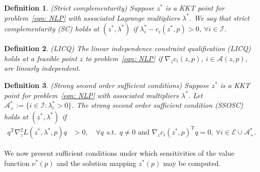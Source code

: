 \documentclass{article}
\newcommand{\tr}[1]{\ensuremath{{#1}^\text{T}}}
\newcommand{\A}{\mathcal{A}}
\newcommand{\E}{\mathcal{E}}
\newcommand{\I}{\mathcal{I}}
\newcommand{\1}[1]{\mathds{1}\left[#1\right]}
\newtheorem{definition}{Definition}
\begin{document}
\begin{definition}{(Strict  complementarity)}
Suppose $z^*$ is a KKT point for problem~\eqref{eqn: NLP} with associated Lagrange multipliers $\lambda^*$. 
We say that strict complementarity (SC) holds at $(z^*, \lambda^*)$ if $\lambda^*_i - c_i(z^*,p) > 0$, $\forall i \in \I$.
\end{definition}




\begin{definition}{(LICQ)}
The linear independence constraint qualification (LICQ) holds at a feasible point $z$ to problem~\eqref{eqn: NLP} if $\nabla_z c_i(z,p)$, $i \in \A(z,p)$, are linearly independent. 
\end{definition}


\begin{definition}{(Strong second order sufficient conditions)}
Suppose $z^*$ is a KKT point for problem~\eqref{eqn: NLP} with associated multipliers $\lambda^*$. 
Let $\A^*_+ := \{i \in \I : \lambda^*_i > 0\}$. 
The strong second order sufficient condition (SSOSC) holds at $(z^*, \lambda^*)$ if
\begin{align*}
   \tr{q} \nabla^2_z L(z^*,\lambda^*,p) q &> 0, \quad \forall q \:\: \text{s.t.} \:\: q \neq 0 \text{  and  } \tr{\nabla_z c_i(z^*,p)} q = 0, \: \forall i \in \E \cup \A^*_+.
\end{align*}
\end{definition}


We now present sufficient conditions under which sensitivities of the value function $\nu^*(p)$ and the solution mapping $z^*(p)$ may be computed.
\end{document}
